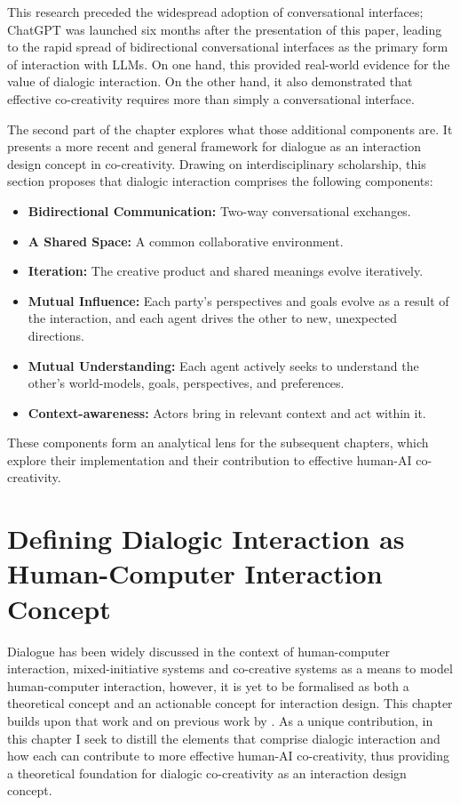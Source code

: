 This research preceded the widespread adoption of conversational interfaces; ChatGPT was launched six months after the presentation of this paper, leading to the rapid spread of bidirectional conversational interfaces as the primary form of interaction with LLMs. On one hand, this provided real-world evidence for the value of dialogic interaction. On the other hand, it also demonstrated that effective co-creativity requires more than simply a conversational interface.

The second part of the chapter explores what those additional components are. It presents a more recent and general framework for dialogue as an interaction design concept in co-creativity. Drawing on interdisciplinary scholarship, this section proposes that dialogic interaction comprises the following components:

\begin{itemize}
\item \textbf{Bidirectional Communication:} Two-way conversational exchanges.
\item \textbf{A Shared Space:} A common collaborative environment.
\item \textbf{Iteration:} The creative product and shared meanings evolve iteratively.
\item \textbf{Mutual Influence:} Each party’s perspectives and goals evolve as a result of the interaction, and each agent drives the other to new, unexpected directions.
\item \textbf{Mutual Understanding:} Each agent actively seeks to understand the other's world-models, goals, perspectives, and preferences.
\item \textbf{Context-awareness:} Actors bring in relevant context and act within it.
\end{itemize}

These components form an analytical lens for the subsequent chapters, which explore their implementation and their contribution to effective human-AI co-creativity.





\section{Defining Dialogic Interaction as Human-Computer Interaction Concept}

Dialogue has been widely discussed in the context of human-computer interaction, mixed-initiative systems and co-creative systems \cite{Allen1999-sr, Yannakakis2014-zs, Deterding2017-wh} as a means to model human-computer interaction, however, it is yet to be formalised as both a theoretical concept and an actionable concept for interaction design. This chapter builds upon that work and on previous work by \cite{Bown2020-oc, Bown2024-yx}. As a unique contribution, in this chapter I seek to distill the elements that comprise dialogic interaction and how each can contribute to more effective human-AI co-creativity, thus providing a theoretical foundation for dialogic co-creativity as an interaction design concept. 

